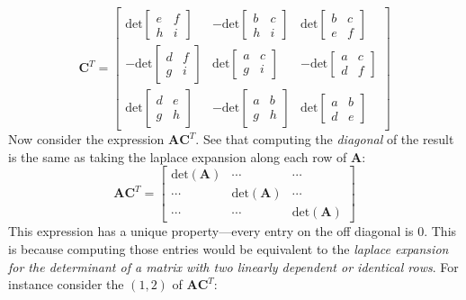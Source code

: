 \documentclass{report}
\begin{document}
\begin{equation*}
\bm C^T=
\left[\begin{array}{ccc}
\text{det}\left[\begin{array}{cc}e&f\\h&i\end{array}\right]&
-\text{det}\left[\begin{array}{cc}b&c\\h&i\end{array}\right]&
\text{det}\left[\begin{array}{cc}b&c\\e&f\end{array}\right]\\
-\text{det}\left[\begin{array}{cc}d&f\\g&i\end{array}\right]&
\text{det}\left[\begin{array}{cc}a&c\\g&i\end{array}\right]&
-\text{det}\left[\begin{array}{cc}a&c\\d&f\end{array}\right]\\
\text{det}\left[\begin{array}{cc}d&e\\g&h\end{array}\right]&
-\text{det}\left[\begin{array}{cc}a&b\\g&h\end{array}\right]&
\text{det}\left[\begin{array}{cc}a&b\\d&e\end{array}\right]
\end{array}\right]
\end{equation*}
Now consider the expression $\bm{AC}^T$. See that computing the \textit{diagonal} of the result is the same as taking the laplace expansion along each row of $\bm A$:
\begin{equation*}
\bm{AC}^T=\left[\begin{array}{ccc}
\text{det}(\bm A)&\cdots&\cdots\\
\cdots&\text{det}(\bm A)&\cdots\\
\cdots&\cdots&\text{det}(\bm A)
\end{array}\right]
\end{equation*}
This expression has a unique property---every entry on the off diagonal is 0. This is because computing those entries would be equivalent to the \textit{laplace expansion 
for the determinant of a matrix with two linearly dependent or identical rows}. For instance consider the $(1,2)$ of $\bm{AC}^T$:
\end{document}
